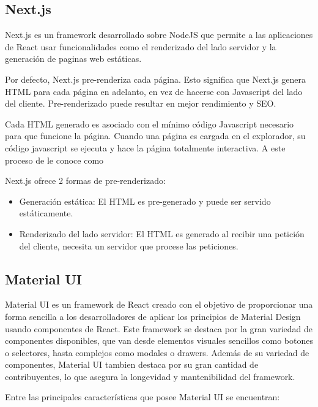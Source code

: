 \subsection{Next.js}

Next.js es un framework desarrollado sobre NodeJS que permite a las aplicaciones de React usar funcionalidades como el renderizado del lado servidor y la generación de paginas web estáticas.

Por defecto, Next.js pre-renderiza cada página. Esto significa que Next.js genera HTML para cada página en adelanto, en vez de hacerse con Javascript del lado del cliente. Pre-renderizado puede resultar en mejor rendimiento y SEO.

Cada HTML generado es asociado con el mínimo código Javascript necesario para que funcione la página. Cuando una página es cargada en el explorador, su código javascript se ejecuta y hace la página totalmente interactiva. A este proceso de le conoce como 

Next.js ofrece 2 formas de pre-renderizado:

\begin{itemize}
  \item Generación estática: El HTML es pre-generado y puede ser servido estáticamente.
  \item Renderizado del lado servidor: El HTML es generado al recibir una petición del cliente, necesita un servidor que procese las peticiones.
\end{itemize}

\subsection{Material UI}

Material UI es un framework de React creado con el objetivo de proporcionar una forma sencilla a los desarrolladores de aplicar los principios de Material Design \cite{MaterialDesignPrinciples} usando componentes de React. Este framework se destaca por la gran variedad de componentes disponibles, que van desde elementos visuales sencillos como botones o selectores, hasta complejos como modales o drawers. Además de su variedad de componentes, Material UI tambien destaca por su gran cantidad de contribuyentes, lo que asegura la longevidad y mantenibilidad del framework.

Entre las principales características que posee Material UI se encuentran:

